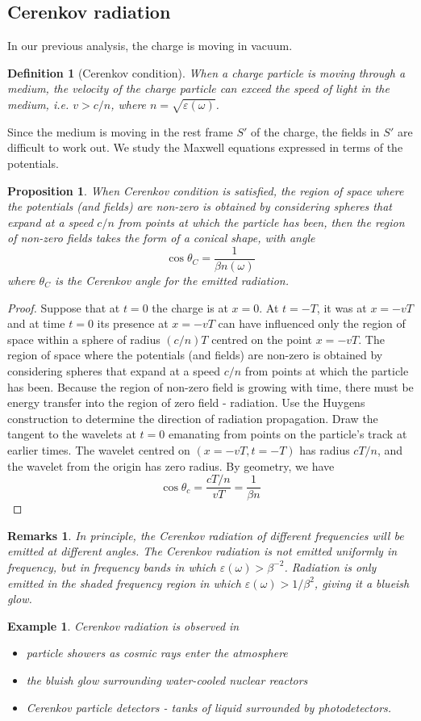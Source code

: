 \documentclass[a4paper]{article}
\newtheorem{remarks}{Remarks}[section]
\newtheorem{eg}{Example}[section]
\theoremstyle{new}
\newtheorem{defi}{Definition}[section]
\newtheorem{prop}{Proposition}[section]
\begin{document}
\subsection{Cerenkov radiation}
In our previous analysis, the charge is moving in vacuum.
\begin{defi}[Cerenkov condition]
When a charge particle is moving through a medium, the velocity of the charge particle can exceed the speed of light in the medium, i.e. $v>c/n$, where $n=\sqrt{\varepsilon(\omega)}$.
\end{defi}
Since the medium is moving in the rest frame $S'$ of the charge, the fields in $S'$ are difficult to work out. We study the Maxwell equations expressed in terms of the potentials.
\begin{prop}
When Cerenkov condition is satisfied, the region of space where the potentials (and fields) are non-zero is obtained by considering spheres that expand at a speed $c/n$ from points at which the particle has been, then the region of non-zero fields takes the form of a conical shape, with angle
$$\cos\theta_C=\frac{1}{\beta n(\omega)}$$
where $\theta_C$ is the Cerenkov angle for the emitted radiation.
\end{prop}
\begin{proof}
Suppose that at $t=0$ the charge is at $x=0$. At $t=-T$, it was at $x=-vT$ and at time $t=0$ its presence at $x=-vT$ can have influenced only the region of space within a sphere of radius $(c/n)T$ centred on the point $x=-vT$. The region of space where the potentials (and fields) are non-zero is obtained by considering spheres that expand at a speed $c/n$ from points at which the particle has been. Because the region of non-zero field is growing with time, there must be energy transfer into the region of zero field - radiation. Use the Huygens construction to determine the direction of radiation propagation. Draw the tangent to the wavelets at $t=0$ emanating from points on the particle's track at earlier times. The wavelet centred on $(x=-vT,t=-T)$ has radius $cT/n$, and the wavelet from the origin has zero radius. By geometry, we have
$$\cos\theta_c=\frac{cT/n}{vT}=\frac{1}{\beta n}$$
\end{proof}
\begin{remarks}
In principle, the Cerenkov radiation of different frequencies will be emitted at different angles. The Cerenkov radiation is not emitted uniformly in frequency, but in frequency bands in which $\varepsilon(\omega)>\beta^{-2}$. Radiation is only emitted in the shaded frequency region in which $\varepsilon(\omega)>1/\beta^2$, giving it a blueish glow.
\end{remarks}
\begin{eg}
Cerenkov radiation is observed in
\begin{itemize}
    \item particle showers as cosmic rays enter the atmosphere
    \item the bluish glow surrounding water-cooled nuclear reactors
    \item Cerenkov particle detectors - tanks of liquid surrounded by photodetectors.
\end{itemize}
\end{eg}
\end{document}
